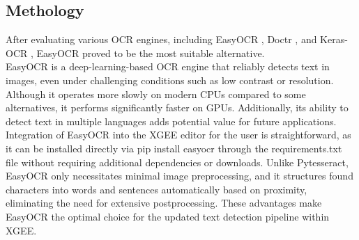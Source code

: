 \subsection{Methology}
After evaluating various OCR engines, including EasyOCR \cite{easyocr_doc}, Doctr \cite{doctr_doc}, and Keras-OCR \cite{keras_ocr_doc}, EasyOCR proved to be the most suitable alternative.\\
EasyOCR is a deep-learning-based OCR engine that reliably detects text in images, even under challenging conditions such as low contrast or resolution. Although it operates more slowly on modern CPUs compared to some alternatives, it performs significantly faster on GPUs. Additionally, its ability to detect text in multiple languages adds potential value for future applications. Integration of EasyOCR into the XGEE editor for the user is straightforward, as it can be installed directly via pip install easyocr through the requirements.txt file without requiring additional dependencies or downloads. Unlike Pytesseract, EasyOCR only necessitates minimal image preprocessing, and it structures found characters into words and sentences automatically based on proximity, eliminating the need for extensive postprocessing. These advantages make EasyOCR the optimal choice for the updated text detection pipeline within XGEE.

